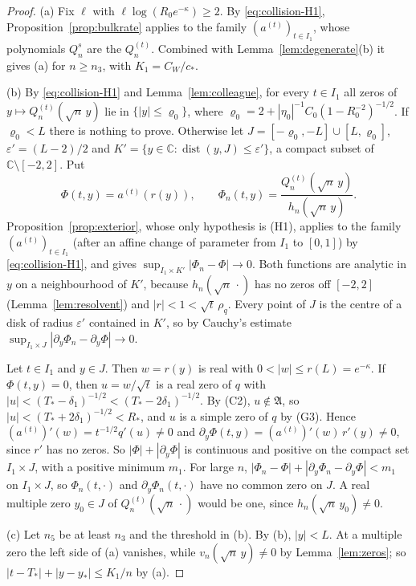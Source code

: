 \documentclass[11pt]{amsart}
\theoremstyle{definition}
\theoremstyle{remark}
\numberwithin{equation}{section}
\newcommand{\C}{\mathbb{C}}
\newcommand{\eps}{\varepsilon}
\DeclareMathOperator{\dist}{dist}
\begin{document}
\begin{proof}
(a) Fix $\ell$ with $\ell\log(R_0e^{-\kappa})\ge2$. By \eqref{eq:collision-H1}, Proposition~\ref{prop:bulkrate} applies to the family $(a^{(t)})_{t\in I_1}$, whose polynomials $Q_n^s$ are the $Q_n^{(t)}$. Combined with Lemma~\ref{lem:degenerate}(b) it gives (a) for $n\ge n_3$, with $K_1=C_W/c_*$.

(b) By \eqref{eq:collision-H1} and Lemma~\ref{lem:colleague}, for every $t\in I_1$ all zeros of $y\mapsto Q_n^{(t)}(\sqrt n\,y)$ lie in $\{|y|\le\varrho_0\}$, where $\varrho_0=2+|\eta_0|^{-1}C_0(1-R_0^{-2})^{-1/2}$. If $\varrho_0<L$ there is nothing to prove. Otherwise let $J=[-\varrho_0,-L]\cup[L,\varrho_0]$, $\eps'=(L-2)/2$ and $K'=\{y\in\C:\dist(y,J)\le\eps'\}$, a compact subset of $\C\setminus[-2,2]$. Put
\[
\Phi(t,y)=a^{(t)}(r(y)),\qquad\Phi_n(t,y)=\frac{Q_n^{(t)}(\sqrt n\,y)}{h_n(\sqrt n\,y)} .
\]
Proposition~\ref{prop:exterior}, whose only hypothesis is (H1), applies to the family $(a^{(t)})_{t\in I_1}$ (after an affine change of parameter from $I_1$ to $[0,1]$) by \eqref{eq:collision-H1}, and gives $\sup_{I_1\times K'}|\Phi_n-\Phi|\to0$. Both functions are analytic in $y$ on a neighbourhood of $K'$, because $h_n(\sqrt n\,\cdot)$ has no zeros off $[-2,2]$ (Lemma~\ref{lem:resolvent}) and $|r|<1<\sqrt t\,\rho_q$. Every point of $J$ is the centre of a disk of radius $\eps'$ contained in $K'$, so by Cauchy's estimate $\sup_{I_1\times J}|\partial_y\Phi_n-\partial_y\Phi|\to0$.

Let $t\in I_1$ and $y\in J$. Then $w=r(y)$ is real with $0<|w|\le r(L)=e^{-\kappa}$. If $\Phi(t,y)=0$, then $u=w/\sqrt t$ is a real zero of $q$ with $|u|<(T_*-\delta_1)^{-1/2}<(T_*-2\delta_1)^{-1/2}$. By (C2), $u\notin\mathfrak A$, so $|u|<(T_*+2\delta_1)^{-1/2}<R_*$, and $u$ is a simple zero of $q$ by (G3). Hence $(a^{(t)})'(w)=t^{-1/2}q'(u)\ne0$ and $\partial_y\Phi(t,y)=(a^{(t)})'(w)\,r'(y)\ne0$, since $r'$ has no zeros. So $|\Phi|+|\partial_y\Phi|$ is continuous and positive on the compact set $I_1\times J$, with a positive minimum $m_1$. For large $n$, $|\Phi_n-\Phi|+|\partial_y\Phi_n-\partial_y\Phi|<m_1$ on $I_1\times J$, so $\Phi_n(t,\cdot)$ and $\partial_y\Phi_n(t,\cdot)$ have no common zero on $J$. A real multiple zero $y_0\in J$ of $Q_n^{(t)}(\sqrt n\,\cdot)$ would be one, since $h_n(\sqrt n\,y_0)\ne0$.

(c) Let $n_5$ be at least $n_3$ and the threshold in (b). By (b), $|y|<L$. At a multiple zero the left side of (a) vanishes, while $v_n(\sqrt n\,y)\ne0$ by Lemma~\ref{lem:zeros}; so $|t-T_*|+|y-y_*|\le K_1/n$ by (a).
\end{proof}
\end{document}
